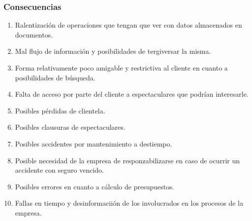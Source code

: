 \subsubsection{Consecuencias}
\begin{enumerate}
	\item Ralentización de operaciones que tengan que ver con datos almacenados en documentos.
	\item Mal flujo de información y posibilidades de tergiversar la misma.
	\item Forma relativamente poco amigable y restrictiva al cliente en cuanto a posibilidades de búsqueda.
	\item Falta de acceso por parte del cliente a espectaculares que podrían interesarle.
	\item Posibles pérdidas de clientela.
	\item Posibles clausuras de espectaculares.
	\item Posibles accidentes por mantenimiento a destiempo.
	\item Posible necesidad de la empresa de responzabilizarse en caso de ocurrir un accidente con seguro vencido.
	\item Posibles errores en cuanto a cálculo de presupuestos.
	\item Fallas en tiempo y desinformaciión de los involucrados en los procesos de la empresa.
\end{enumerate}